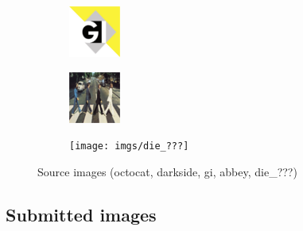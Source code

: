 \begin{figure}[!h]
\begin{subfigure}{.19\linewidth}
\end{subfigure}
\begin{subfigure}{.19\linewidth}
  \centering
  \includegraphics[width=0.7\linewidth]{imgs/gi}
\end{subfigure}
\begin{subfigure}{.19\linewidth}
  \centering
  \includegraphics[width=0.7\linewidth]{imgs/abbey}
\end{subfigure}
\begin{subfigure}{.19\linewidth}
  \centering
  \texttt{[image: imgs/die\_???]}
\end{subfigure}
\caption{Source images (octocat, darkside, gi, abbey, die\_???)}
\label{fig:source_images}
\end{figure}

\subsection{Submitted images}

